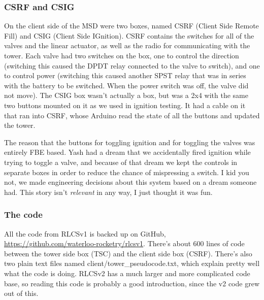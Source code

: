 \documentclass[11pt]{article}
\begin{document}
\subsubsection{CSRF and CSIG}
\label{sec:org877647f}

On the client side of the MSD were two boxes, named CSRF (Client Side Remote
Fill) and CSIG (Client Side IGnition). CSRF contains the switches for all of the
valves and the linear actuator, as well as the radio for communicating with the
tower. Each valve had two switches on the box, one to control the direction
(switching this caused the DPDT relay connected to the valve to switch), and one
to control power (switching this caused another SPST relay that was in series
with the battery to be switched. When the power switch was off, the valve did
not move). The CSIG box wasn't actually a box, but was a 2x4 with the same two
buttons mounted on it as we used in ignition testing. It had a cable on it that
ran into CSRF, whose Arduino read the state of all the buttons and updated the
tower.

The reason that the buttons for toggling ignition and for toggling the valves
was entirely FBE based. Yash had a dream that we accidentally fired ignition
while trying to toggle a valve, and because of that dream we kept the controls
in separate boxes in order to reduce the chance of mispressing a switch. I kid
you not, we made engineering decisions about this system based on a dream
someone had. This story isn't \emph{relevant} in any way, I just thought it was fun.

\subsubsection{The code}
\label{sec:org32e305f}

All the code from RLCSv1 is backed up on GitHub,
\url{https://github.com/waterloo-rocketry/rlcsv1}. There's about 600 lines of code
between the tower side box (TSC) and the client side box (CSRF). There's also
two plain text files named client/tower\_pseudocode.txt, which explain pretty well
what the code is doing. RLCSv2 has a much larger and more complicated code base,
so reading this code is probably a good introduction, since the v2 code grew out
of this.
\end{document}
